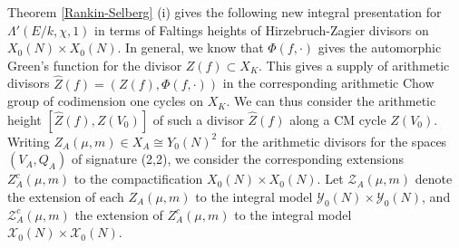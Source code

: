 \documentclass{amsart}
\theoremstyle{definition}
\theoremstyle{definition}
\theoremstyle{definition}
\begin{document}
Theorem \ref{Rankin-Selberg} (i) gives the following new integral presentation for $\Lambda'(E/k, \chi, 1)$ in terms of Faltings heights of Hirzebruch-Zagier divisors on $X_0(N) \times X_0(N)$.
In general, we know that $\Phi(f, \cdot)$ gives the automorphic Green's function for the divisor $Z(f) \subset X_K$. 
This gives a supply of arithmetic divisors $\widehat{Z}(f) = (Z(f), \Phi(f, \cdot))$ in the corresponding arithmetic Chow group of codimension one cycles on $X_K$. 
We can thus consider the arithmetic height $[ \widehat{Z}(f), Z(V_0)]$ of such a divisor $\widehat{Z}(f)$ along a CM cycle $Z(V_0)$.
Writing $Z_A(\mu, m) \in X_A \cong Y_0(N)^2$ for the arithmetic divisors for the spaces $(V_A, Q_A)$ of signature (2,2), 
we consider the corresponding extensions $Z_A^c(\mu, m)$ to the compactification $X_0(N) \times X_0(N)$. 
Let $\mathcal{Z}_A(\mu, m)$ denote the extension of each $Z_A(\mu, m)$ to the integral model $\mathcal{Y}_0(N) \times \mathcal{Y}_0(N)$,
and $\mathcal{Z}^c_A(\mu, m)$ the extension of $Z_A^c(\mu, m)$ to the integral model $\mathcal{X}_0(N) \times \mathcal{X}_0(N)$. 
\end{document}

